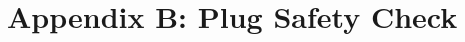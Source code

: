 	
	
	     \chapter{Appendix B: Plug Safety Check}
     \vspace{-15mm}
     \begin{figure}[!htb]
     \centering
       \label{fig:}
	\end{figure}